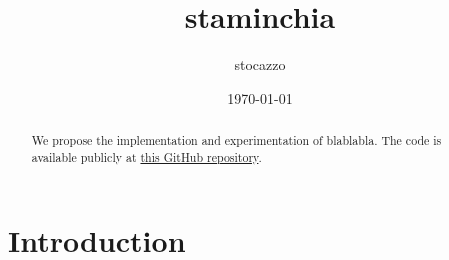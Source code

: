 \documentclass[a4paper, twocolumn, 11pt, twoside]{article}
\title{staminchia}
\author{stocazzo}
\date{\today}
\begin{document}
\maketitle

\begin{abstract}

    We propose the implementation and experimentation of blablabla. The code is available publicly at
    \href{https://github.com/neverorfrog/vehicle-control}{this GitHub
    repository}.
\end{abstract}


\section{Introduction}




\end{document}
